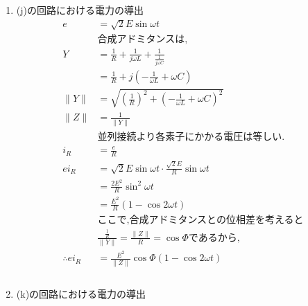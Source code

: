 \documentclass[twocolumn]{article}
\begin{document}
\begin{enumerate}
  \item (j)の回路における電力の導出
        \begin{align*}
          e               & = \sqrt{2}E\sin\omega t                                                                 \\
                          & \text{合成アドミタンスは,}                                                                       \\
          Y               & = \frac{1}{R} + \frac{1}{j\omega L} + \frac{1}{\frac{1}{j\omega C}}                     \\
                          & = \frac{1}{R} + j\left(-\frac{1}{\omega L} + \omega C\right)                            \\
          \|Y\|           & = \sqrt{{\left(\frac{1}{R}\right)}^2 + {\left(-\frac{1}{\omega L} + \omega C\right)}^2} \\
          \|Z\|           & = \frac{1}{\|Y\|}                                                                       \\
                          & \text{並列接続より各素子にかかる電圧は等しい.}                                                             \\
          i_R             & = \frac{e}{R}                                                                           \\
          ei_R            & = \sqrt{2}E\sin\omega t \cdot \frac{\sqrt{2}E}{R}\sin\omega t                           \\
                          & = \frac{2E^2}{R}\sin^2 \omega t                                                         \\
                          & = \frac{E^2}{R}\left(1 - \cos 2 \omega t\right)                                         \\
                          & \text{ここで,合成アドミタンスとの位相差を考えると}                                                           \\
                          & \frac{\frac{1}{R}}{\|Y\|} = \frac{\|Z\|}{R} = \cos \Phi\text{であるから,}                    \\
          \therefore ei_R & = \frac{E^2}{\|Z\|}\cos \Phi\left(1 - \cos 2 \omega t\right)                            \\                           \\
        \end{align*}

  \item (k)の回路における電力の導出
        \begin{align*}
        \end{align*}

\end{enumerate}
\end{document}
